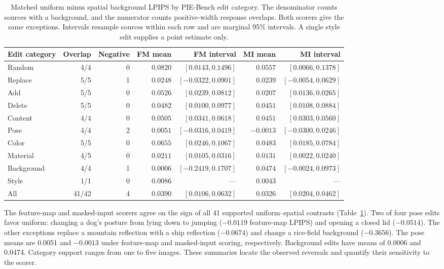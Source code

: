\begin{table}[t]
\centering\small
\caption{Matched uniform minus spatial background LPIPS by PIE-Bench edit category. The denominator counts sources with a background, and the numerator counts positive-width response overlaps. Both scorers give the same exceptions. Intervals resample sources within each row and are marginal 95\% intervals. A single style edit supplies a point estimate only.}
\label{tab:v19-selectivity-category}
\begin{tabular}{@{}lrrrrrr@{}}
\toprule
Edit category & Overlap & Negative & FM mean & FM interval & MI mean & MI interval\\
\midrule
Random & 4/4 & 0 & $0.0820$ & $[0.0143, 0.1496]$ & $0.0557$ & $[0.0066, 0.1378]$ \\
Replace & 5/5 & 1 & $0.0248$ & $[-0.0322, 0.0901]$ & $0.0239$ & $[-0.0054, 0.0629]$ \\
Add & 5/5 & 0 & $0.0526$ & $[0.0239, 0.0812]$ & $0.0207$ & $[0.0136, 0.0265]$ \\
Delete & 5/5 & 0 & $0.0482$ & $[0.0100, 0.0977]$ & $0.0451$ & $[0.0108, 0.0884]$ \\
Content & 4/4 & 0 & $0.0505$ & $[0.0341, 0.0618]$ & $0.0451$ & $[0.0303, 0.0560]$ \\
Pose & 4/4 & 2 & $0.0051$ & $[-0.0316, 0.0419]$ & $-0.0013$ & $[-0.0300, 0.0246]$ \\
Color & 5/5 & 0 & $0.0655$ & $[0.0246, 0.1067]$ & $0.0483$ & $[0.0185, 0.0784]$ \\
Material & 4/5 & 0 & $0.0211$ & $[0.0105, 0.0316]$ & $0.0131$ & $[0.0022, 0.0240]$ \\
Background & 4/4 & 1 & $0.0006$ & $[-0.2419, 0.1707]$ & $0.0474$ & $[-0.0024, 0.0973]$ \\
Style & 1/1 & 0 & $0.0086$ & --- & $0.0043$ & --- \\
\midrule
All & 41/42 & 4 & $0.0390$ & $[0.0106, 0.0632]$ & $0.0326$ & $[0.0204, 0.0462]$ \\
\bottomrule
\end{tabular}
\end{table}

The feature-map and masked-input scorers agree on the sign of all 41 supported
uniform--spatial contrasts (Table~\ref{tab:v19-selectivity-category}).
Two of four pose edits favor uniform: changing a dog's posture from lying
down to jumping ($-0.0119$ feature-map LPIPS) and opening a closed lid
($-0.0514$). The other exceptions replace a mountain reflection with a
ship reflection ($-0.0674$) and change a rice-field background ($-0.3656$).
The pose means are 0.0051 and $-0.0013$ under feature-map and masked-input
scoring, respectively. Background edits have means of 0.0006 and 0.0474.
Category support ranges from one to five images. These summaries locate
the observed reversals and quantify their sensitivity to the scorer.

